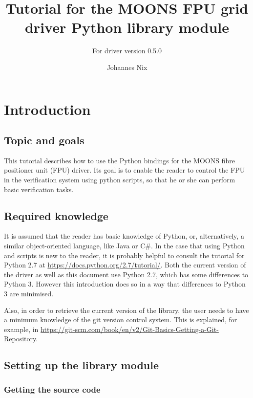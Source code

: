 \documentclass{scrartcl}[12pt,a4paper]
\begin{document}
\title{Tutorial for the MOONS FPU grid driver Python library
  module} \subtitle{For driver version 0.5.0}

\author{Johannes Nix}

\maketitle

\tableofcontents


\section{Introduction}
\subsection{Topic and goals}
This tutorial describes how to use the Python bindings for the MOONS
fibre positioner unit (FPU) driver. Its goal is to enable the reader
to control the FPU in the verification system using python scripts, so
that he or she can perform basic verification tasks.


\subsection{Required knowledge}

It is assumed that the reader has basic knowledge of Python, or,
alternatively, a similar object-oriented language, like Java or C\#.
In the case that using Python and scripts is new to the reader, it is
probably helpful to consult the tutorial for Python 2.7 at
\url{https://docs.python.org/2.7/tutorial/}.  Both the current version
of the driver as well as this document use Python 2.7, which has some
differences to Python 3. However this introduction does so in a way
that differences to Python 3 are minimised.

Also, in order to retrieve the current version of the library,
the user needs to have a minimum knowledge of the git version
control system. This is explained, for example, in \url{https://git-scm.com/book/en/v2/Git-Basics-Getting-a-Git-Repository}.

\subsection{Setting up the library module}

\subsubsection{Getting the source code}
\end{document}
